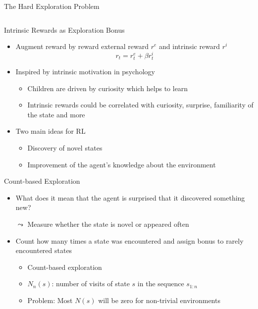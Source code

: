 \documentclass[aspectratio=169]{../latex_main/tntbeamer}  %
\begin{document}
\begin{frame}[c]{The Hard Exploration Problem}
\begin{columns}
    \end{columns}
 



\end{frame}
\begin{frame}[c]{Intrinsic Rewards as Exploration Bonus}
	
	\begin{itemize}
		\item Augment reward by reward external reward $r^e$ and intrinsic reward $r^i$
		$$r_t = r^e_t + \beta r_t^i $$
		\item Inspired by intrinsic motivation in psychology
		\begin{itemize}
			\item Children are driven by curiosity which helps to learn
			\item Intrinsic rewards could be correlated with curiosity, surprise, familiarity of the state and more
		\end{itemize}
            \pause
		\item Two main ideas for RL
		\begin{itemize}
			\item Discovery of novel states
			\item Improvement of the agent's knowledge about the environment
		\end{itemize}
	\end{itemize}
	
\end{frame}
\begin{frame}[c]{Count-based Exploration}
	
	\begin{itemize}
		\item What does it mean that the agent is surprised that it discovered something new?
		\item[$\leadsto$] Measure whether the state is novel or appeared often
		\item Count how many times a state was encountered and assign bonus to rarely encountered states
		\begin{itemize}
			\item Count-based exploration
			\item $N_n(s)$: number of visits of state $s$ in the sequence $s_{1:n}$
			\item Problem: Most $N(s)$ will be zero for non-trivial environments
		\end{itemize}
	\end{itemize}
	
\end{frame}
\end{document}
